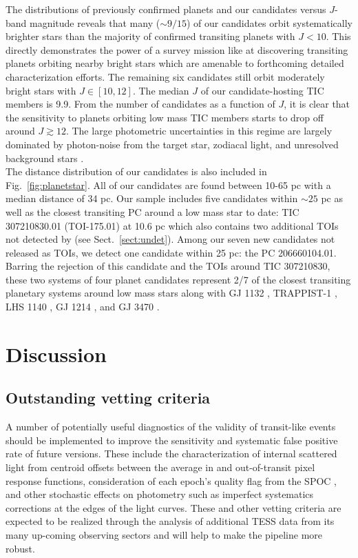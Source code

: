 The distributions of previously confirmed planets
and our candidates versus $J$-band magnitude reveals that many ($\sim 9/15$) of our candidates
orbit systematically brighter stars than the majority of confirmed transiting planets with
$J<10$. This directly demonstrates the power of a survey mission like \tess{} at discovering
transiting planets orbiting nearby bright stars which are amenable to forthcoming detailed
characterization efforts. The remaining six candidates still orbit moderately
bright stars with $J \in [10,12]$. The median $J$ of our candidate-hosting TIC members is 9.9.
From the number of \pipeline{} candidates as a function of $J$,
it is clear that the \pipeline{} sensitivity to planets orbiting low mass TIC members starts to drop
off around $J \gtrsim 12$.
The large photometric uncertainties in this regime are largely dominated by photon-noise
from the target star, zodiacal light, and unresolved background stars \citep{ricker15}. \\

The distance distribution of our candidates is also included in Fig.~\ref{fig:planetstar}. All of
our candidates are found between 10-65 pc with a median distance of 34 pc. Our sample includes
five candidates within $\sim 25$ pc as well as the closest transiting PC around a low mass star to date:
TIC 307210830.01 (TOI-175.01) at 10.6 pc which also contains two additional TOIs \citep{kostov19,cloutier19c}
not detected by \pipeline{} (see Sect.~\ref{sect:undet}). Among our seven new candidates not
released as TOIs, we detect one candidate within 25 pc: the PC 206660104.01.
Barring the rejection of this candidate and the TOIs around TIC 307210830, these two systems of four
planet candidates represent 2/7 of the %
closest transiting planetary systems around low mass stars along with GJ 1132 \citep{berta15,bonfils18},
TRAPPIST-1 \citep{gillon17,luger17}, LHS 1140 \citep{dittmann17a,ment18}, GJ 1214 \citep{charbonneau09}, and
GJ 3470 \citep{bonfils12}.


\section{Discussion} \label{sect:disc}
\subsection{Outstanding vetting criteria} \label{sect:caveats}
A number of potentially useful diagnostics of the validity of transit-like events should be implemented
to improve the sensitivity and systematic false positive rate of future \pipeline{} versions. These include 
the characterization of internal scattered light from centroid offsets between the average in and out-of-transit
pixel response functions, consideration
of each epoch's quality flag from the SPOC \citep{jenkins16},
and other stochastic effects on photometry such as imperfect systematics corrections at the edges of the light
curves. These and other vetting criteria are expected to be realized through the analysis of additional TESS data
from its many up-coming observing sectors and will help to make the \pipeline{} pipeline more robust. 


